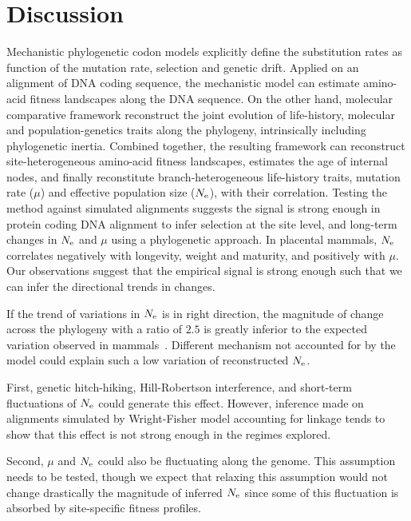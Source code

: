 \section{Discussion}
\label{sec:Discussion}
Mechanistic phylogenetic \gls{codon} models explicitly define the \gls{substitution} rates as function of the mutation rate, selection and genetic drift.
Applied on an alignment of \acrshort{DNA} coding sequence, the mechanistic model can estimate amino-acid fitness landscapes along the \acrshort{DNA} sequence.
On the other hand, molecular comparative framework reconstruct the joint evolution of life-history, molecular and population-genetics traits along the phylogeny, intrinsically including phylogenetic inertia.
Combined together, the resulting framework can reconstruct site-heterogeneous amino-acid fitness landscapes, estimates the age of internal nodes, and finally reconstitute branch-heterogeneous life-history traits, mutation rate ($\mu$) and effective population size ($N_{\mathrm{e}}$), with their correlation.
Testing the method against simulated alignments suggests the signal is strong enough in protein coding \acrshort{DNA} alignment to infer selection at the site level, and long-term changes in $N_{\mathrm{e}}$ and $\mu$ using a phylogenetic approach.
In placental mammals, $N_{\mathrm{e}}$ correlates negatively with longevity, weight and maturity, and positively with $\mu$.
Our observations suggest that the empirical signal is strong enough such that we can infer the directional trends in changes.

If the trend of variations in $N_{\mathrm{e}}$ is in right direction, the magnitude of change across the phylogeny with a ratio of $2.5$ is greatly inferior to the expected variation observed in mammals~\citep{Galtier2016}.
Different mechanism not accounted for by the model could explain such a low variation of reconstructed $N_{\mathrm{e}}$.

First, genetic hitch-hiking, Hill-Robertson interference, and short-term fluctuations of $N_{\mathrm{e}}$ could generate this effect.
However, inference made on alignments simulated by Wright-Fisher model accounting for linkage tends to show that this effect is not strong enough in the regimes explored.

Second, $\mu$ and $N_{\mathrm{e}}$ could also be fluctuating along the genome.
This assumption needs to be tested, though we expect that relaxing this assumption would not change drastically the magnitude of inferred $N_{\mathrm{e}}$ since some of this fluctuation is absorbed by site-specific fitness profiles.

